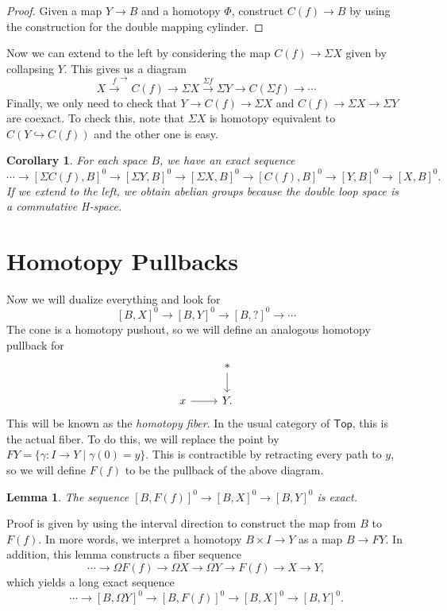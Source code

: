 \documentclass[leqno, openany]{memoir}
\newtheorem{cor}[thm]{Corollary}
\newtheorem{lem}[thm]{Lemma}
\theoremstyle{definition}
\theoremstyle{remark}
\theoremstyle{plain}
\theoremstyle{definition}
\theoremstyle{remark}
\newcommand{\ms}[1]{\mathsf{#1}}
\begin{document}
\begin{proof} Given a map $Y \to B$ and a homotopy $\Phi$, construct $C(f) \to
B$ by using the construction for the double mapping cylinder.  \end{proof}

Now we can extend to the left by considering the map $C(f) \to \Sigma X$ given
by collapsing $Y$. This gives us a diagram \[ X \xrightarrow{f} ^ \to C(f) \to
\Sigma X \xrightarrow{\Sigma f} \Sigma Y \to C(\Sigma f) \to \cdots \] Finally,
we only need to check that $Y \to C(f) \to \Sigma X$ and $C(f) \to \Sigma X \to
\Sigma Y$ are coexact. To check this, note that $\Sigma X$ is homotopy
equivalent to $C(Y \hookrightarrow C(f))$ and the other one is easy.

\begin{cor} For each space $B$, we have an exact sequence \[ \cdots \to [\Sigma
C(f),B]^0 \to [\Sigma Y, B]^0 \to [\Sigma X,B]^0 \to [C(f),B]^0 \to [Y,B]^0 \to
[X,B]^0. \] If we extend to the left, we obtain \textit{abelian groups} because
the double loop space is a commutative H-space.  \end{cor}

\section{Homotopy Pullbacks}%

Now we will dualize everything and look for \[ [B,X]^0 \to [B,Y]^0 \to [B,?]^0
    \to \cdots \] The cone is a homotopy pushout, so we will define an
    analogous homotopy pullback for \begin{equation} \begin{tikzcd} & *
        \arrow{d} \\ x \arrow{r} & Y.  \end{tikzcd} \end{equation} This will be
        known as the \textit{homotopy fiber}. In the usual category of
        $\ms{Top}$, this is the actual fiber. To do this, we will replace the
        point by $F Y = \{ \gamma: I \to Y \mid \gamma(0) = y \}$. This is
        contractible by retracting every path to $y$, so we will define $F(f)$
        to be the pullback of the above diagram.

\begin{lem} The sequence $[B,F(f)]^0 \to [B,X]^0 \to [B,Y]^0$ is exact.
\end{lem}

Proof is given by using the interval direction to construct the map from $B$ to
$F(f)$. In more words, we interpret a homotopy $B \times I \to Y$ as a map $B
\to FY$. In addition, this lemma constructs a fiber sequence \[ \cdots \to
\Omega F(f) \to \Omega X \to \Omega Y \to F(f) \to X \to Y, \] which yields a
long exact sequence \[ \cdots \to [B, \Omega Y]^0 \to [B,F(f)]^0 \to [B,X]^0
\to [B,Y]^0. \]
\end{document}
